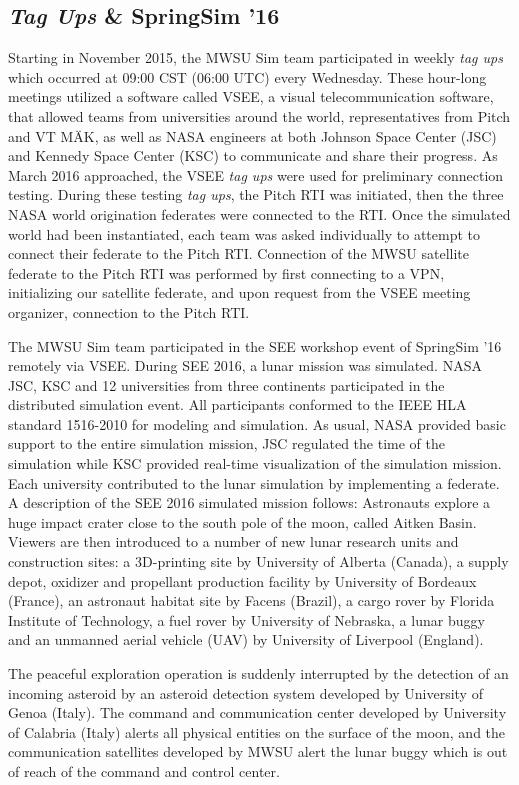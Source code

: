 \documentclass[journal, onecolumn]{IEEEtran}
\begin{document}
\subsection{\textit{Tag Ups} \& SpringSim '16}
Starting in November 2015, the MWSU Sim team participated in weekly \textit{tag ups} which occurred at 09:00 CST (06:00 UTC) every Wednesday.  These hour-long meetings utilized a software called VSEE, a visual telecommunication software, that allowed teams from universities around the world, representatives from Pitch and VT M{\"A}K, as well as NASA engineers at both Johnson Space Center (JSC) and Kennedy Space Center (KSC) to communicate and share their progress.  As March 2016 approached, the VSEE \textit{tag ups} were used for preliminary connection testing. During these testing \textit{tag ups}, the Pitch RTI was initiated, then the three NASA world origination federates were connected to the RTI.  Once the simulated world had been instantiated, each team was asked individually to attempt to connect their federate to the Pitch RTI.  Connection of the MWSU satellite federate to the Pitch RTI was performed by first connecting to a VPN, initializing our satellite federate, and upon request from the VSEE meeting organizer, connection to the Pitch RTI.  

The MWSU Sim team participated in the SEE workshop event of SpringSim '16 remotely via VSEE. During SEE 2016, a lunar mission was simulated. NASA JSC, KSC and 12 universities from three continents participated in the distributed simulation event. All participants conformed to the IEEE HLA standard 1516-2010 for modeling and simulation. As usual, NASA provided basic support to the entire simulation mission, JSC regulated the time of the simulation while KSC provided real-time visualization of the simulation mission. Each university contributed to the lunar simulation by implementing a federate. A description of the SEE 2016 simulated mission follows: Astronauts explore a huge impact crater close to the south pole of the moon, called Aitken Basin.  Viewers are then introduced to a number of new lunar research units and construction sites: a 3D-printing site by University of Alberta (Canada), a supply depot, oxidizer and propellant production facility by University of Bordeaux (France), an astronaut habitat site by Facens (Brazil), a cargo rover by Florida Institute of Technology, a fuel rover by University of Nebraska, a lunar buggy and an unmanned aerial vehicle (UAV) by University of Liverpool (England).

The peaceful exploration operation is suddenly interrupted by the detection of an incoming asteroid by an asteroid detection system developed by University of Genoa (Italy). The command and communication center \cite{falcone2014simulation} developed by University of Calabria (Italy) alerts all physical entities on the surface of the moon, and the communication satellites developed by MWSU alert the lunar buggy which is out of reach of the command and control center.
\end{document}
